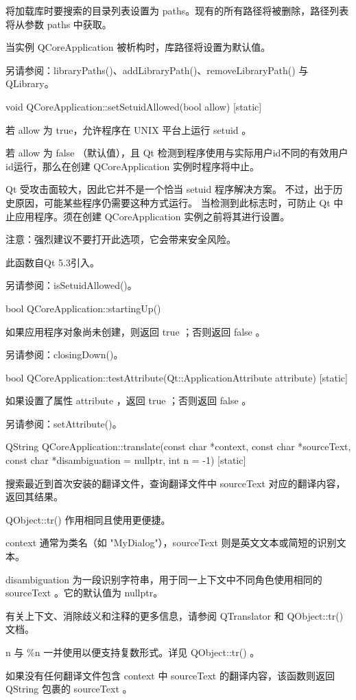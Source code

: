 将加载库时要搜索的目录列表设置为 paths。现有的所有路径将被删除，路径列表将从参数 paths 中获取。

当实例 QCoreApplication 被析构时，库路径将设置为默认值。

另请参阅：libraryPaths()、addLibraryPath()、removeLibraryPath() 与 QLibrary。

void QCoreApplication::setSetuidAllowed(bool allow) [static]

若 allow 为 true，允许程序在 UNIX 平台上运行 setuid 。

若 allow 为 false （默认值），且 Qt 检测到程序使用与实际用户id不同的有效用户id运行，那么在创建 QCoreApplication 实例时程序将中止。

Qt 受攻击面较大，因此它并不是一个恰当 setuid 程序解决方案。 不过，出于历史原因，可能某些程序仍需要这种方式运行。 当检测到此标志时，可防止 Qt 中止应用程序。须在创建 QCoreApplication 实例之前将其进行设置。

注意：强烈建议不要打开此选项，它会带来安全风险。

此函数自Qt 5.3引入。

另请参阅：isSetuidAllowed()。

bool QCoreApplication::startingUp()

如果应用程序对象尚未创建，则返回 true ；否则返回 false 。

另请参阅：closingDown()。

bool QCoreApplication::testAttribute(Qt::ApplicationAttribute attribute) [static]

如果设置了属性 attribute ，返回 true ；否则返回 false 。

另请参阅：setAttribute()。

QString QCoreApplication::translate(const char *context, const char *sourceText, const char *disambiguation = nullptr, int n = -1) [static]

搜索最近到首次安装的翻译文件，查询翻译文件中 sourceText 对应的翻译内容，返回其结果。

QObject::tr() 作用相同且使用更便捷。

context 通常为类名（如 "MyDialog"），sourceText 则是英文文本或简短的识别文本。

disambiguation 为一段识别字符串，用于同一上下文中不同角色使用相同的 sourceText 。它的默认值为 nullptr。

有关上下文、消除歧义和注释的更多信息，请参阅 QTranslator 和 QObject::tr() 文档。

n 与 \%n 一并使用以便支持复数形式。详见 QObject::tr() 。

如果没有任何翻译文件包含 context 中 sourceText 的翻译内容，该函数则返回 QString 包裹的 sourceText 。

